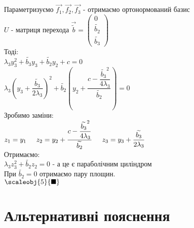 \documentclass[a4paper, 10pt]{article}
\theoremstyle{theoremdd}
\begin{document}
Параметризуємо $\vec{f_1}, \vec{f_2}, \vec{f_3}$ - отримаємо ортонормований базис\\
$U$ - матриця перехода $\vec{\widetilde{b}} = \begin{pmatrix}
0 \\ \widetilde{b_2} \\ \widetilde{b_3}
\end{pmatrix}$\\
Тоді:\\
$\lambda_3 y_3^2 + \widetilde{b_3} y_3 + \widetilde{b_2} y_2 + c = 0$\\
$\lambda_3 \left(y_3 + \dfrac{\widetilde{b_3}}{2 \lambda_3} \right)^2 + \widetilde{b_2} \left(y_2 + \dfrac{c - \dfrac{\widetilde{b_3}^2}{4\lambda_3}}{\widetilde{b_2}} \right) = 0$\\
Зробимо заміни:\\
$z_1 = y_1 \hspace{0.5cm}
z_2 = y_2 + \dfrac{c - \dfrac{\widetilde{b_3}^2}{4\lambda_3}}{\widetilde{b_2}} \hspace{0.5cm}
z_3 = y_3 + \dfrac{\widetilde{b_3}}{2 \lambda_3}
$\\
Отримаємо:\\
$\lambda_3 z_3^2 + \widetilde{b_2} z_2 = 0$ - а це є параболічним циліндром\\
При $\widetilde{b_2} = 0$ отримаємо пару площин.\\
$\scaleobj{5}{\blacksquare}$
\newpage

\iffalse
\section{Альтернативні пояснення}
\end{document}
